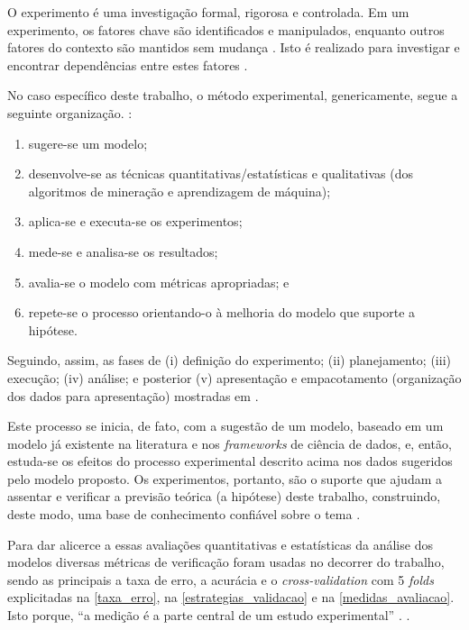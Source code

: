\documentclass[
	12pt,				%
	openright,			%
	oneside,			%
	a4paper,			%
	english,			%
	french,				%
	spanish,			%
	brazil				%
	]{abntex2}
\begin{document}
O experimento é uma investigação formal, rigorosa e controlada. Em um experimento, os fatores chave são identificados e manipulados, enquanto outros fatores do contexto são mantidos sem mudança \cite[p. 11]{wohlin_experimentation_2000}. Isto é realizado para investigar e encontrar dependências entre estes fatores \cite[p. 63]{wazlawick2009} .

No caso específico deste trabalho, o método experimental, genericamente, segue a seguinte organização. \cite[p. 3]{travassos_introducao_2002}:
\begin{enumerate}
	\item sugere-se um modelo; 
	\item desenvolve-se as técnicas quantitativas/estatísticas e qualitativas (dos algoritmos de mineração e aprendizagem de máquina);
	\item aplica-se e executa-se os experimentos;
	\item mede-se e analisa-se os resultados;
	\item avalia-se o modelo com métricas apropriadas; e
	\item repete-se o processo orientando-o à melhoria do modelo que suporte a hipótese.
\end{enumerate}

Seguindo, assim, as fases de (i) definição do experimento; (ii) planejamento; (iii) execução; (iv) análise; e posterior (v) apresentação e empacotamento (organização dos dados para apresentação) mostradas em .

Este processo se inicia, de fato, com a sugestão de um modelo, baseado em um modelo já existente na literatura e nos \textit{frameworks} de ciência de dados, e, então, estuda-se os efeitos do processo experimental descrito acima nos dados sugeridos pelo modelo proposto. Os experimentos, portanto, são o suporte que ajudam a assentar e verificar a previsão teórica (a hipótese) deste trabalho, construindo, deste modo, uma base de conhecimento confiável sobre o tema \cite[p. 3 e 4]{travassos_introducao_2002}.

Para dar alicerce a essas avaliações quantitativas e estatísticas da análise dos modelos diversas métricas de verificação foram usadas no decorrer do trabalho, sendo as principais a taxa de erro, a acurácia e o \textit{cross-validation} com 5 \textit{folds} explicitadas na \autoref{taxa_erro}, na \autoref{estrategias_validacao} e na \autoref{medidas_avaliacao}. Isto porque, ``a medição é a parte central de um estudo experimental'' \cite[p. 10]{travassos_introducao_2002}. 
. 
\end{document}
